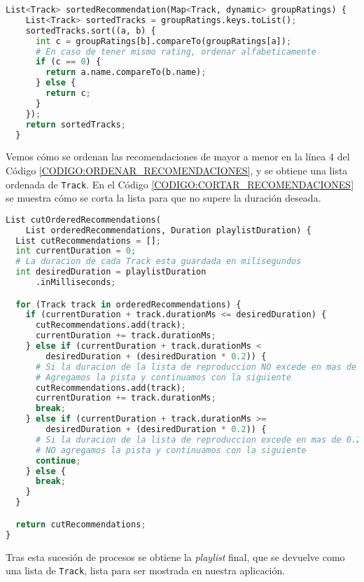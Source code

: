 \begin{lstlisting}[language=python, caption=Ordenar recomendaciones, label=CODIGO:ORDENAR_RECOMENDACIONES]
  List<Track> sortedRecommendation(Map<Track, dynamic> groupRatings) {
    List<Track> sortedTracks = groupRatings.keys.toList();
    sortedTracks.sort((a, b) {
      int c = groupRatings[b].compareTo(groupRatings[a]);
      # En caso de tener mismo rating, ordenar alfabeticamente
      if (c == 0) {
        return a.name.compareTo(b.name);
      } else {
        return c;
      }
    });
    return sortedTracks;
  }
\end{lstlisting}

Vemos cómo se ordenan las recomendaciones de mayor a menor en la línea 4 del Código \ref{CODIGO:ORDENAR_RECOMENDACIONES},
y se obtiene una lista ordenada de \texttt{Track}. En el Código \ref{CODIGO:CORTAR_RECOMENDACIONES} se muestra cómo se corta
la lista para que no supere la duración deseada.

\begin{lstlisting}[language=python, caption=Cortar recomendaciones, label=CODIGO:CORTAR_RECOMENDACIONES]
List cutOrderedRecommendations(
    List orderedRecommendations, Duration playlistDuration) {
  List cutRecommendations = [];
  int currentDuration = 0;
  # La duracion de cada Track esta guardada en milisegundos
  int desiredDuration = playlistDuration
      .inMilliseconds; 

  for (Track track in orderedRecommendations) {
    if (currentDuration + track.durationMs <= desiredDuration) {
      cutRecommendations.add(track);
      currentDuration += track.durationMs;
    } else if (currentDuration + track.durationMs <
        desiredDuration + (desiredDuration * 0.2)) {
      # Si la duracion de la lista de reproduccion NO excede en mas de 0.2 la duracion deseada
      # Agregamos la pista y continuamos con la siguiente
      cutRecommendations.add(track);
      currentDuration += track.durationMs;
      break;
    } else if (currentDuration + track.durationMs >=
        desiredDuration + (desiredDuration * 0.2)) {
      # Si la duracion de la lista de reproduccion excede en mas de 0.2 la duracion deseada
      # NO agregamos la pista y continuamos con la siguiente
      continue;
    } else {
      break;
    }
  }

  return cutRecommendations;
}
\end{lstlisting}

Tras esta sucesión de procesos se obtiene la \textit{playlist} final, que se devuelve como una lista de \texttt{Track},
lista para ser mostrada en nuestra aplicación.

